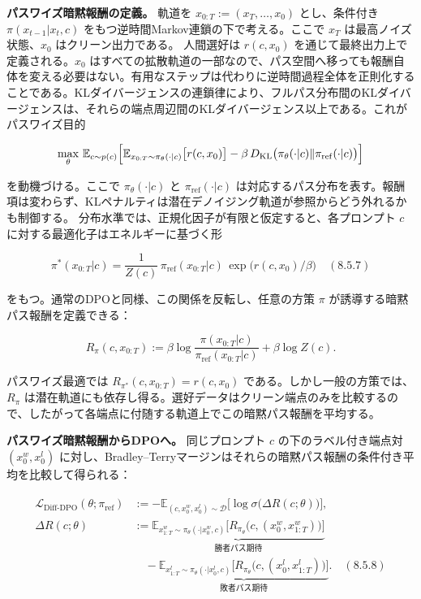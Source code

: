 \textbf{パスワイズ暗黙報酬の定義。} 軌道を $x_{0:T}:=(x_T,\ldots,x_0)$ とし、条件付き $\pi(x_{t-1}|x_t,c)$ をもつ逆時間Markov連鎖の下で考える。ここで $x_T$ は最高ノイズ状態、$x_0$ はクリーン出力である。
人間選好は $r(c,x_0)$ を通じて最終出力上で定義される。$x_0$ はすべての拡散軌道の一部なので、パス空間へ移っても報酬自体を変える必要はない。有用なステップは代わりに逆時間過程全体を正則化することである。KLダイバージェンスの連鎖律により、フルパス分布間のKLダイバージェンスは、それらの端点周辺間のKLダイバージェンス以上である。これがパスワイズ目的

\[
\max_\theta\,\mathbb{E}_{c\sim p(c)}\Bigl[\mathbb{E}_{x_{0:T}\sim\pi_\theta(\cdot|c)}\bigl[r(c,x_0)\bigr]-\beta\,D_{\mathrm{KL}}\bigl(\pi_\theta(\cdot|c)\|\pi_{\mathrm{ref}}(\cdot|c)\bigr)\Bigr]
\]


を動機づける。ここで $\pi_\theta(\cdot|c)$ と $\pi_{\mathrm{ref}}(\cdot|c)$ は対応するパス分布を表す。報酬項は変わらず、KLペナルティは潜在デノイジング軌道が参照からどう外れるかも制御する。
分布水準では、正規化因子が有限と仮定すると、各プロンプト $c$ に対する最適化子はエネルギーに基づく形

\[
\pi^*(x_{0:T}|c)=\frac{1}{Z(c)}\,\pi_{\mathrm{ref}}(x_{0:T}|c)\,\exp\bigl(r(c,x_0)/\beta\bigr) \quad (8.5.7)
\]


をもつ。通常のDPOと同様、この関係を反転し、任意の方策 $\pi$ が誘導する暗黙パス報酬を定義できる：

\[
R_\pi(c,x_{0:T}):=\beta\log\frac{\pi(x_{0:T}|c)}{\pi_{\mathrm{ref}}(x_{0:T}|c)}+\beta\log Z(c).
\]


パスワイズ最適では $R_{\pi^*}(c,x_{0:T})=r(c,x_0)$ である。しかし一般の方策では、$R_\pi$ は潜在軌道にも依存し得る。選好データはクリーン端点のみを比較するので、したがって各端点に付随する軌道上でこの暗黙パス報酬を平均する。

\textbf{パスワイズ暗黙報酬からDPOへ。} 同じプロンプト $c$ の下のラベル付き端点対 $(x_0^w,x_0^l)$ に対し、Bradley–Terryマージンはそれらの暗黙パス報酬の条件付き平均を比較して得られる：

\begin{align*}
\begin{aligned}
\mathcal{L}_{\mathrm{Diff\text{-}DPO}}(\theta;\pi_{\mathrm{ref}})
&:=-\mathbb{E}_{(c,x_0^w,x_0^l)\sim\mathcal{D}}\bigl[\log\sigma\bigl(\Delta R(c;\theta)\bigr)\bigr], \\
\Delta R(c;\theta)
&:=\underbrace{\mathbb{E}_{x_{1:T}^w\sim\pi_\theta(\cdot|x_0^w,c)}\bigl[R_{\pi_\theta}\bigl(c,(x_0^w,x_{1:T}^w)\bigr)\bigr]}_{\text{勝者パス期待}} \\
&\quad-\underbrace{\mathbb{E}_{x_{1:T}^l\sim\pi_\theta(\cdot|x_0^l,c)}\bigl[R_{\pi_\theta}\bigl(c,(x_0^l,x_{1:T}^l)\bigr)\bigr]}_{\text{敗者パス期待}}. \quad (8.5.8)
\end{aligned}
\end{align*}


